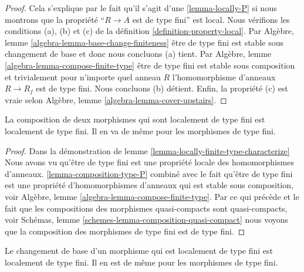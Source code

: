 \begin{proof}

Cela s'explique par le fait qu'il s'agit d'une \ref{lemma-locally-P} si nous montrons que la propriété ``$R \to A$ est de type fini'' est local. Nous vérifions les conditions (a), (b) et (c) de la définition
\ref{definition-property-local}. Par Algèbre, lemme \ref{algebra-lemma-base-change-finiteness}
être de type fini est stable sous changement de base et donc nous concluons (a) tient. Par Algèbre, lemme
\ref{algebra-lemma-compose-finite-type} être de type fini est stable sous composition et trivialement pour n'importe quel anneau
$R$ l'homomorphisme d'anneaux $R \to R_f$ est de type fini. Nous concluons (b) détient. Enfin, la propriété (c) est vraie selon Algèbre, lemme \ref{algebra-lemma-cover-upstairs}.

\end{proof}

\begin{lemma}

\label{lemma-composition-finite-type}
La composition de deux morphismes qui sont localement de type fini est localement de type fini. Il en va de même pour les morphismes de type fini.
\end{lemma}

\begin{proof}

Dans la démonstration de lemme \ref{lemma-locally-finite-type-characterize}
Nous avons vu qu'être de type fini est une propriété locale des homomorphismes d'anneaux. \ref{lemma-composition-type-P} combiné avec le fait qu'être de type fini est une propriété d'homomorphismes d'anneaux qui est stable sous composition, voir Algèbre, lemme \ref{algebra-lemma-compose-finite-type}. Par ce qui précède et le fait que les compositions des morphismes quasi-compacts sont quasi-compacts, voir Schémas, lemme \ref{schemes-lemma-composition-quasi-compact}
nous voyons que la composition des morphismes de type fini est de type fini.

\end{proof}

\begin{lemma}

\label{lemma-base-change-finite-type}

Le changement de base d'un morphisme qui est localement de type fini est localement de type fini. Il en est de même pour les morphismes de type fini.

\end{lemma}

